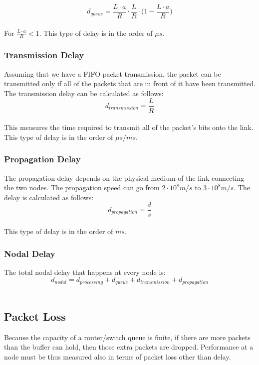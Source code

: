 \documentclass{article}
\begin{document}
	\[ d_{queue} = \frac{L \cdot a}{R} \cdot \frac{L}{R} \cdot \Big(1 - \frac{L \cdot a}{R}\Big) \] \\
	
\noindent For $\displaystyle \frac{L \cdot a}{R} < 1$. This type of delay is in the order of $\mu s$.

\subsubsection{Transmission Delay}
Assuming that we have a FIFO packet transmission, the packet can be transmitted only if all of the packets that are in front of it have been transmitted. The transmission delay can be calculated as follows: \\

	\[ d_{transmission} = \frac{L}{R} \] \\
	
\noindent This measures the time required to transmit all of the packet's bits onto the link. This type of delay is in the order of $\mu s / ms$.

\subsubsection{Propagation Delay}
The propagation delay depends on the physical medium of the link connecting the two nodes. The propagation speed can go from $2 \cdot 10^8 m/s$ to $3 \cdot 10^8 m/s$. The delay is calculated as follows: \\

	\[ d_{propagation} = \frac{d}{s} \] \\
	
\noindent This type of delay is in the order of $ms$.

\subsubsection{Nodal Delay}
The total nodal delay that happens at every node is: \\

	\[ d_{nodal} = d_{processing} + d_{queue} + d_{transmission} + d_{propagation} \] \
	
\subsection{Packet Loss}
Because the capacity of a router/switch queue is finite, if there are more packets than the buffer can hold, then those extra packets are dropped. Performance at a node must be thus measured also in terms of packet loss other than delay.
\end{document}
